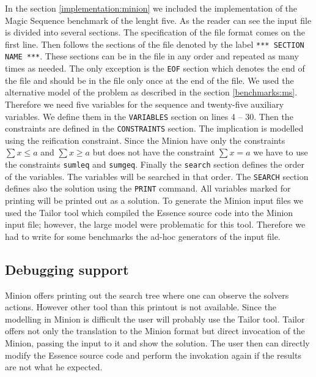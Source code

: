 In the section \ref{implementation:minion} we included the implementation of the Magic
Sequence benchmark of the lenght five. As the reader can see the input file
is divided into several sections. The specification of the file format comes on the first line.
Then follows the sections of the file denoted by the label \texttt{*** SECTION NAME ***}. These
sections can be in the file in any order and repeated as many times as needed. The
only exception is the \texttt{EOF} section which denotes the end of the file and should be in
the file only once at the end of the file. We used the alternative model of the 
problem as described in the section \ref{benchmarks:ms}. Therefore we need five 
variables for the sequence and twenty-five auxiliary variables. We define them in 
the \texttt{VARIABLES} section on lines 4 -- 30. Then the constraints are defined in the 
\texttt{CONSTRAINTS} section. The implication is modelled using the reification constraint.
Since the Minion have only the constraints $\sum{x} \leq a$ and $\sum{x} \geq a$ but
 does not have the constraint $\sum{x} = a$ we have to use the constraints \texttt{sumleq} and
 \texttt{sumgeq}. Finally the \texttt{search} section defines the order of the variables.
 The variables will be searched in that order. The \texttt{SEARCH} section defines also the
 solution using the \texttt{PRINT} command. All variables marked for printing will
 be printed out as a solution. To generate the Minion input files we used the Tailor tool which
 compiled the Essence source code into the Minion input file; however, the large
 model were problematic for this tool. Therefore we had to write for some benchmarks
 the ad-hoc generators of the input file.
 
\subsection{Debugging support}
Minion offers printing out the search tree where one can observe the solvers actions.
However other tool than this printout is not available. Since the modelling in Minion
is difficult the user will probably use the Tailor tool. Tailor offers not only the translation
to the Minion format but direct invocation of the Minion, passing the input to it and
show the solution. The user then can directly modify the Essence source code and perform
the invokation again if the results are not what he expected. 


